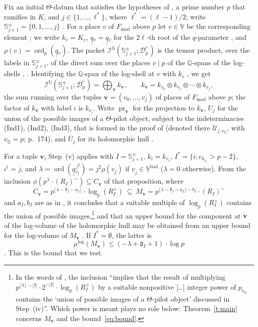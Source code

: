 \documentclass[11pt]{amsart}
\theoremstyle{remark}
\newcommand{\Q}{\mathbb Q}
\newcommand{\cI}{\mathcal I}
\newcommand{\cU}{\mathcal U}
\newcommand{\dd}{\mathfrak d}
\newcommand{\qq}{\underline{\underline{q}}{}}
\newcommand{\Fmod}{F_{\mathrm{mod}}}
\newcommand{\VV}{\underline{\mathbb V}}
\newcommand{\Vbad}{\underline{\mathbb V}^{\mathrm{bad}}}
\newcommand{\mulog}{\mu^{\log}}
\newcommand{\RIt}{(R_I)^{\sim}}
\newcommand{\pr}{\operatorname{pr}}
\newcommand{\Sj}{\mathbb S^{\pm}_{j+1}}
\newcommand{\Dp}{\mathcal D^{\vdash}_{p}}
\newcommand{\bv}{\mathbf v}
\begin{document}
Fix an initial $\Theta$-datum \cite[Def.~3.1, pp.~61--63]{IUT1} that satisfies the hypotheses of
\cite[Thm.~1.10, pp.~22--23]{IUT4}, a prime number $p$ that ramifies in $K$, and $j\in\{1,\dots,\ell^*\}$, where
$\ell^*=(\ell-1)/2$; write $\Sj=\{0,1,\dots,j\}$ \cite[p.~27]{IUT4}. For a place $v$ of $\Fmod$ above $p$ let $\underline v\in\VV$ be the corresponding element
\cite[Def.~3.1(e)]{IUT1}; we write $k_v=K_{\underline v}$, $\qq_v=\qq_{\underline v}$ for the $2\ell$-th root of
the $q$-parameter \cite[Ex.~3.2(iv), p.~71]{IUT1}, and $\rho(v)=\operatorname{ord}_p(\qq_v)$. The packet
$\cI^{\Q}(\Sj;\Dp)$ is the tensor product, over the labels in $\Sj$, of the direct sum over the places $v\mid p$ of
the $\Q$-spans of the log-shells \cite[p.~27]{IUT4}, \cite[Prop.~3.2, pp.~97--98]{IUT3}. Identifying the $\Q$-span
of the log-shell at $v$ with $k_v$ \cite[Rem.~3.1.1(i), p.~93; Prop.~3.2(i)]{IUT3}, we get
\[
\cI^{\Q}(\Sj;\Dp)=\bigoplus_{\bv}k_{\bv},\qquad k_{\bv}=k_{v_0}\otimes k_{v_1}\otimes\cdots\otimes k_{v_j},
\]
the sum running over the tuples $\bv=(v_0,\dots,v_j)$ of places of $\Fmod$ above $p$; the factor of $k_{\bv}$ with
label $i$ is $k_{v_i}$. Write $\pr_{\bv}$ for the projection to $k_{\bv}$, $U_j$ for the union of the possible
images of a $\Theta$-pilot object, subject to the indeterminacies (Ind1), (Ind2), (Ind3), that is formed in the
proof of \cite[Cor.~3.12]{IUT3} (denoted there $\cU_{j,v_{\Q}}$, with $v_{\Q}=p$; p.~174), and $\overline U_j$ for its
holomorphic hull \cite[Rem.~3.9.5(i), p.~127]{IUT3}.

For a tuple $\bv$, Step~(v) \cite[pp.~27--28]{IUT4} applies \cite[Prop.~1.4(iii), p.~13]{IUT4} with
$I=\Sj$, $k_i=k_{v_i}$, $I^*=\{i:e_{k_{v_i}}>p-2\}$, $i^\dagger=j$, and $\lambda=\operatorname{ord}(\qq_{v_j}^{\,j^2})
=j^2\rho(v_j)$ if $\underline v_j\in\Vbad$ ($\lambda=0$ otherwise). From the
inclusion $\phi(p^\lambda\cdot\RIt)\subseteq C_{\bv}$ of that proposition, where
\[
C_{\bv}=p^{\lfloor\lambda-\dd_I-a_I\rfloor}\cdot\log_p(R_I^\times)\ \subseteq\
M_{\bv}=p^{\lfloor\lambda-\dd_I-a_I\rfloor-b_I}\cdot\RIt
\]
and $a_I,b_I$ are as in \cite[Prop.~1.2]{IUT4}, it concludes that a suitable multiple of $\log_p(R_I^\times)$
contains the union of possible images,\footnote{In the words of \cite[p.~27]{IUT4}, the inclusion ``implies that
the result of multiplying $p^{\lfloor\lambda\rfloor-|I|}\cdot2^{-|I|}\cdot\log_p(R_I^\times)$ by a suitable nonpositive
[\dots] integer power of $p_{v_{\Q}}$ contains the `union of possible images of a $\Theta$-pilot object' discussed in
Step~(iv)''. Which power is meant plays no role below: Theorem~\ref{t:main} concerns $M_{\bv}$ and the
bound~\eqref{eq:bound}.} and that an upper bound for the component at $\bv$ of the log-volume of the holomorphic
hull may be obtained from an upper bound for the log-volume of $M_{\bv}$ \cite[p.~28]{IUT4}. If $I^*=\emptyset$, the
latter is
\begin{equation}\label{eq:bound}
\mulog(M_{\bv})\le(-\lambda+\dd_I+1)\cdot\log p
\end{equation}
\cite[Prop.~1.4(iii)]{IUT4}. This is the bound that we test.
\end{document}
